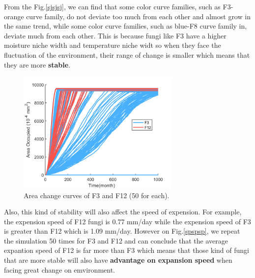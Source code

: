 \documentclass[a4paper,12pt]{article}
\begin{document}
From the Fig.\eqref{sjsjsj}, we can find that some color curve families, such as F3-orange curve family, do not deviate too much from each other and almost grow in the same trend, while some color curve families, such as blue-F8 curve family in, deviate much from each other. This is because fungi like F3 have a higher moisture niche width and temperature niche widt so when they face the fluctuation of the environment, their range of change is smaller which means that they are more \textbf{stable}.
\begin{figure}[H] 
	\centering 
	\includegraphics[height=6cm]{./picture/3vs12.pdf}
	\caption{Area change curves of F3 and F12 (50 for each).}
	\label{spspsp}
\end{figure}
\par Also, this kind of stability will also affect the speed of expension. For example, the expension speed of F12 fungi is 0.77 mm/day while the expension speed of F3 is greater than F12 which is 1.09 mm/day. However on Fig.\eqref{spspsp}, we repeat the simulation 50 times for F3 and F12 and can conclude that the average expantion speed of F12 is far more than F3 which means that those kind of fungi that are more stable will also have \textbf{advantage on expansion speed} when facing great change on emvironment. 
\end{document}

